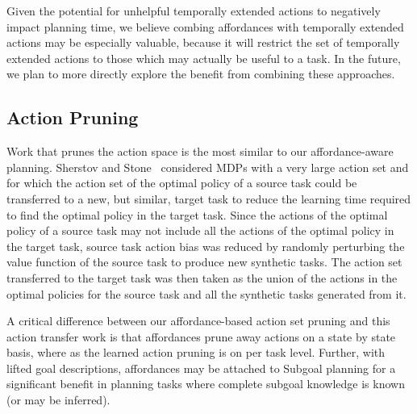 \documentclass[]{article}
\newcommand{\jmnote}[1]{\textcolor{Green}{\textbf{JM: #1}}}
\begin{document}
Given the potential for unhelpful temporally extended actions to negatively impact planning time, we believe combing affordances with temporally extended actions
may be especially valuable, because it will restrict the set of temporally extended actions to those
which may actually be useful to a task. In the future, we plan to more directly explore the benefit from combining
these approaches.



\subsection{Action Pruning}

Work that prunes the action space is the most similar to our affordance-aware planning.
Sherstov and Stone~\cite{sherstov2005improving} considered MDPs with a very large action set and for which the action
set of the optimal policy of a source task could be transferred to a new, but similar, target
task to reduce the learning time required to find the optimal policy in the target task. Since the actions
of the optimal policy of a source task may not include all the actions of the optimal policy
in the target task, source task action bias was reduced by randomly perturbing the value function
of the source task to produce new synthetic tasks. The action set transferred to the target task
was then taken as the union of the actions in the optimal policies for the source task and all the
synthetic tasks generated from it.

A critical difference between our affordance-based action set pruning and this action transfer
work is that affordances prune away actions on a state by state basis, where
as the learned action pruning is on per task level. %
Further,
with lifted goal descriptions, affordances may be attached to Subgoal planning for a significant
benefit in planning tasks where complete subgoal knowledge is known (or may be inferred).
\end{document}
